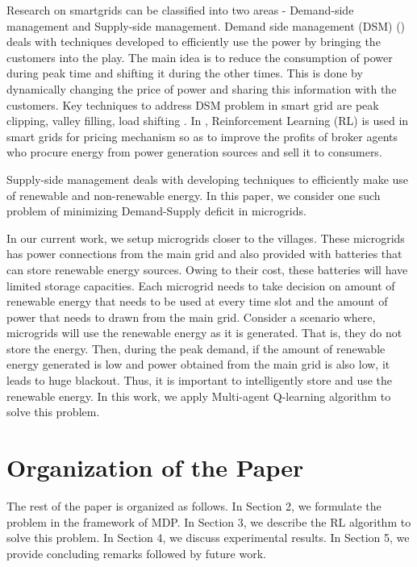 Research on smartgrids can be classified into two areas -  Demand-side management and Supply-side management. Demand side management (DSM) (\cite{logenthiran2011multi, wang2010demand,dsm1,dsm2,dsm3,dsm4}) deals with techniques developed to efficiently use the power by bringing the customers into the play. The main idea is to reduce the consumption of power during peak time and shifting it during the other times. This is done by dynamically changing the price of power and sharing this information with the customers. Key techniques to address DSM problem in smart grid are peak clipping, valley filling,  load shifting \cite{maharjan2010demand}. In \cite{reddy2011learned, reddy2011strategy}, Reinforcement Learning (RL) \cite{sutton} is used in smart grids for pricing mechanism so as to improve the profits of broker agents who procure energy from power generation sources and sell it to consumers.  

Supply-side management deals with developing techniques to efficiently make use of renewable and non-renewable energy. In this paper, we consider one such problem of minimizing Demand-Supply deficit in microgrids. 

In our current work, we setup microgrids closer to the villages. These microgrids has power connections from the main grid and also provided with batteries that can store renewable energy sources. Owing to their cost, these batteries will have limited storage capacities. Each microgrid needs to take decision on amount of renewable energy that needs to be used at every time slot and the amount of power that needs to drawn from the main grid. Consider a scenario where, microgrids will use the renewable energy as it is generated. That is, they do not store the energy. Then, during the peak demand, if the amount of renewable energy generated is low and power obtained from the main grid is also low, it leads to huge blackout. Thus, it is important to intelligently store and use the renewable energy. In this work, we apply Multi-agent Q-learning algorithm to solve this problem.

\section*{Organization of the Paper}	
The rest of the paper is organized as follows. In Section 2, we formulate the problem in the framework of MDP. In Section 3, we describe the RL algorithm to solve this problem. In Section 4, we discuss experimental results. In Section 5, we provide concluding remarks followed by future work.